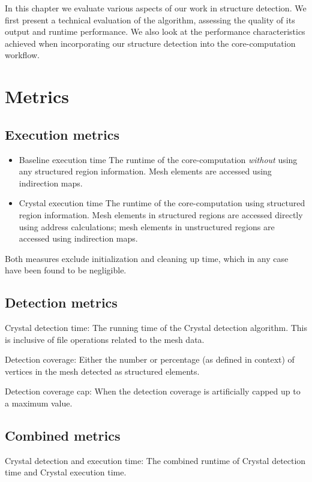 \label{chap:evaluation}

In this chapter we evaluate various aspects of our work in structure detection.
We first present a technical evaluation of the algorithm, assessing the quality of its output and runtime performance. We also look at the performance characteristics achieved when incorporating our structure detection into the core-computation workflow.


\section{Metrics}
\subsection{Execution metrics}
\begin{itemize}
\item Baseline execution time
The runtime of the core-computation \emph{without} using any structured region information. Mesh elements are accessed using indirection maps.

\item Crystal execution time
The runtime of the core-computation using structured region information. Mesh elements in structured regions are accessed directly using address calculations; mesh elements in unstructured regions are accessed using indirection maps.
\end{itemize}
Both measures exclude initialization and cleaning up time, which in any case have been found to be negligible.

\subsection{Detection metrics}

Crystal detection time:
The running time of the Crystal detection algorithm. This is inclusive of file operations related to the mesh data.

Detection coverage:
Either the number or percentage (as defined in context) of vertices in the mesh detected as structured elements.

Detection coverage cap:
When the detection coverage is artificially capped up to a maximum value.

\subsection{Combined metrics}
Crystal detection and execution time:
The combined runtime of Crystal detection time and Crystal execution time.

